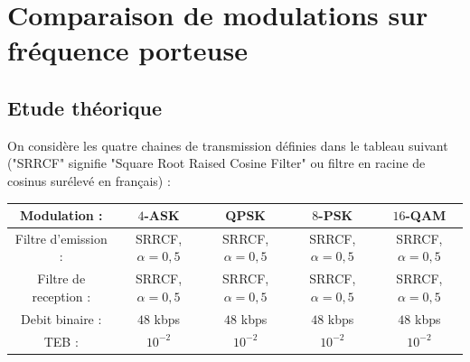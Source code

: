 \documentclass[frenchb]{article}
\begin{document}
\section{Comparaison de modulations sur fréquence porteuse}

\subsection{Etude théorique}
On considère les quatre chaines de transmission définies dans le tableau suivant ("SRRCF" signifie "Square Root Raised Cosine Filter" ou filtre en racine de cosinus surélevé en français) :

\begin{table} [H]
\begin{center}
  \begin{tabular}{ |c || c | c | c | c |}
    \hline
    Modulation : & $4$-ASK & QPSK & $8$-PSK & $16$-QAM \\ \hline
    Filtre d'emission : & SRRCF, $\alpha=0,5$ & SRRCF, $\alpha=0,5$ & SRRCF, $\alpha=0,5$ & SRRCF, $\alpha=0,5$ \\ \hline
    Filtre de reception : & SRRCF, $\alpha=0,5$ & SRRCF, $\alpha=0,5$ & SRRCF, $\alpha=0,5$ & SRRCF, $\alpha=0,5$ \\ \hline
    Debit binaire : & $48$ kbps & $48$ kbps & $48$ kbps & $48$ kbps \\ \hline
    TEB :  & $10^{-2}$ & $10^{-2}$ & $10^{-2}$ & $10^{-2}$ \\ \hline
    \hline

  \end{tabular}
\end{center}
  \label{table:minus6db}
\end{table}
\end{document}
